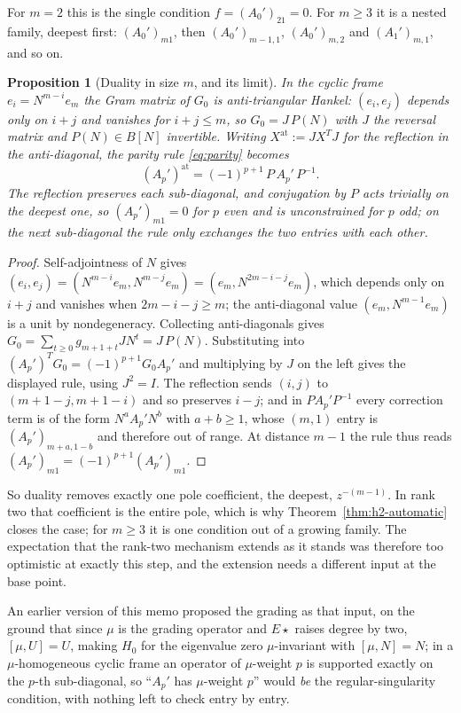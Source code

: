 \documentclass[11pt]{article}
\newtheorem{proposition}[theorem]{Proposition}
\theoremstyle{definition}
\theoremstyle{remark}
\begin{document}
For $m=2$ this is the single condition $f=(A_0')_{21}=0$. For $m\ge3$ it is a
nested family, deepest first: $(A_0')_{m1}$, then $(A_0')_{m-1,1}$,
$(A_0')_{m,2}$ and $(A_1')_{m,1}$, and so on.

\begin{proposition}[Duality in size $m$, and its limit]
\label{prop:size-m-duality}
In the cyclic frame $e_i=N^{m-i}e_m$ the Gram matrix of $G_0$ is anti-triangular
Hankel: $(e_i,e_j)$ depends only on $i+j$ and vanishes for $i+j\le m$, so
$G_0=J\,P(N)$ with $J$ the reversal matrix and $P(N)\in B[N]$ invertible.
Writing $X^{\mathrm{at}}:=JX^TJ$ for the reflection in the anti-diagonal, the
parity rule \eqref{eq:parity} becomes
\[
  (A_p')^{\mathrm{at}}=(-1)^{p+1}\,P\,A_p'\,P^{-1}.
\]
The reflection preserves each sub-diagonal, and conjugation by $P$ acts trivially
on the deepest one, so $(A_p')_{m1}=0$ for $p$ even and is unconstrained for $p$
odd; on the next sub-diagonal the rule only exchanges the two entries with each
other.
\end{proposition}

\begin{proof}
Self-adjointness of $N$ gives
$(e_i,e_j)=(N^{m-i}e_m,N^{m-j}e_m)=(e_m,N^{2m-i-j}e_m)$, which depends only on
$i+j$ and vanishes when $2m-i-j\ge m$; the anti-diagonal value
$(e_m,N^{m-1}e_m)$ is a unit by nondegeneracy. Collecting anti-diagonals gives
$G_0=\sum_{t\ge0}g_{m+1+t}JN^t=J\,P(N)$. Substituting into
$(A_p')^TG_0=(-1)^{p+1}G_0A_p'$ and multiplying by $J$ on the left gives the
displayed rule, using $J^2=I$. The reflection sends $(i,j)$ to $(m+1-j,m+1-i)$
and so preserves $i-j$; and in $PA_p'P^{-1}$ every correction term is of the
form $N^aA_p'N^b$ with $a+b\ge1$, whose $(m,1)$ entry is $(A_p')_{m+a,1-b}$ and
therefore out of range. At distance $m-1$ the rule thus reads
$(A_p')_{m1}=(-1)^{p+1}(A_p')_{m1}$.
\end{proof}

So duality removes exactly one pole coefficient, the deepest, $z^{-(m-1)}$. In
rank two that coefficient is the entire pole, which is why
Theorem~\ref{thm:h2-automatic} closes the case; for $m\ge3$ it is one condition
out of a growing family. The expectation that the rank-two mechanism extends as
it stands was therefore too optimistic at exactly this step, and the extension
needs a different input at the base point.

An earlier version of this memo proposed the grading as that input, on the
ground that since $\mu$ is the grading operator and $E\star$ raises degree by
two, $[\mu,U]=U$, making $H_0$ for the eigenvalue zero $\mu$-invariant with
$[\mu,N]=N$; in a $\mu$-homogeneous cyclic frame an operator of $\mu$-weight $p$
is supported exactly on the $p$-th sub-diagonal, so ``$A_p'$ has $\mu$-weight
$p$'' would \emph{be} the regular-singularity condition, with nothing left to
check entry by entry.
\end{document}
